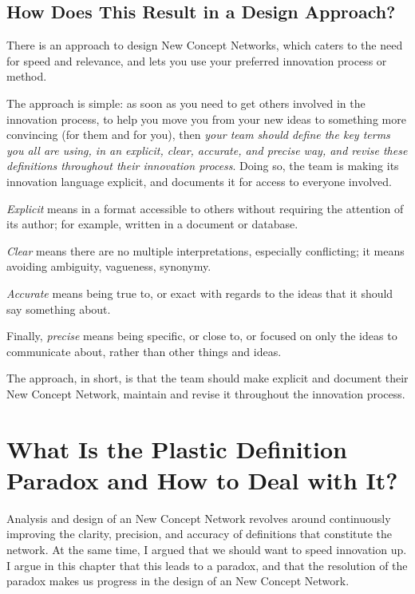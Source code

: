 \documentclass[graybox,envcountchap,sectrefs]{svmono}
\newcommand{\ncnf}{New Concept Network}
\newcommand{\newdef}[1]{Plastic Definition}
\newcommand{\ndparadox}[1]{\newdef{} Paradox}
\begin{document}
\section{How Does This Result in a Design Approach?}
\label{c2:s8}
There is an approach to design \ncnf s, which caters to the need for speed and relevance, and lets you use your preferred innovation process or method.

The approach is simple: as soon as you need to get others involved in the innovation process, to help you move you from your new ideas to something more convincing (for them and for you), then \textit{your team should define the key terms you all are using, in an explicit, clear, accurate, and precise way, and revise these definitions throughout their innovation process}. Doing so, the team is making its innovation language explicit, and documents it for access to everyone involved.

\textit{Explicit} means in a format accessible to others without requiring the attention of its author; for example, written in a document or database. 

\textit{Clear} means there are no multiple interpretations, especially conflicting; it means avoiding ambiguity, vagueness, synonymy. 

\textit{Accurate} means being true to, or exact with regards to the ideas that it should say something about. 

Finally, \textit{precise} means being specific, or close to, or focused on only the ideas to communicate about, rather than other things and ideas. 

The approach, in short, is that the team should make explicit and document their \ncnf, maintain and revise it throughout the innovation process.


\printbibliography

\chapter{What Is the \ndparadox{} and How to Deal with It?}
\label{c3}

Analysis and design of an \ncnf{} revolves around continuously improving the clarity, precision, and accuracy of definitions that constitute the network. At the same time, I argued that we should want to speed innovation up. I argue in this chapter that this leads to a paradox, and that the resolution of the paradox makes us progress in the design of an \ncnf.
\end{document}
